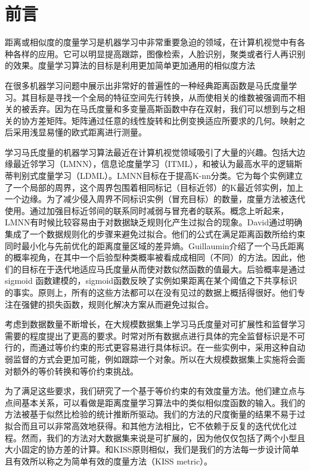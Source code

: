 \section{前言}
距离或相似度的度量学习是机器学习中非常重要急迫的领域，在计算机视觉中有各种各样的应用。它可以明显提高跟踪\cite{zheng2011person}，图像检索\cite{hoi2006learning}，人脸识别\cite{guillaumin2010multiple}，聚类\cite{ye2007adaptive}或者行人再识别\cite{dikmen2010pedestrian}的效果。度量学习算法的目标是利用更加简单更加通用的相似度方法

在很多机器学习问题中展示出非常好的普遍性的一种经典距离函数是马氏度量学习。其目标是寻找一个全局的特征空间先行转换，从而使相关的维数被强调而不相关的被丢弃。因为在马氏度量和多变量高斯函数中存在双射，我们可以想到与之相关的协方差矩阵。矩阵通过任意的线性旋转和比例变换适应所要求的几何。映射之后采用浅显易懂的欧式距离进行测量。

学习马氏度量的机器学习算法最近在计算机视觉领域吸引了大量的兴趣。包括大边缘最近邻学习（LMNN）\cite{weinberger2009distance,weinberger2008fast}，信息论度量学习（ITML）\cite{davis2007information}，和被认为最高水平的逻辑斯蒂判别式度量学习（LDML）\cite{guillaumin2009you}。LMNN\cite{weinberger2009distance,weinberger2008fast}目标在于提高K-nn分类。它为每个实例建立了一个局部的周界，这个周界包围着相同标记（目标近邻）的K最近邻实例，加上一个边缘。为了减少侵入周界不同标识实例（冒充目标）的数量，度量方法被迭代使用。通过加强目标近邻间的联系同时减弱与冒充者的联系。概念上听起来，LMNN有时候比较容易由于对数据缺乏规则化产生过拟合的现象。David\cite{davis2007information}通过明确集成了一个数据规则化的步骤来避免过拟合。他们的公式在满足距离函数所给约束同时最小化与先前优化的距离度量区域的差异熵。Guillaumin\cite{guillaumin2009you}介绍了一个马氏距离的概率视角，在其中一个后验型种类概率被看成成相同（不同）的方法。因此，他们的目标在于迭代地适应马氏度量从而使对数似然函数的值最大。后验概率是通过sigmoid 函数建模的，sigmoid函数反映了实例如果距离在某个阈值之下共享标识的事实。原则上，所有的这些方法都可以在没有见过的数据上概括得很好。他们专注在强健的损失函数，规则化解决方案从而避免过拟合。

考虑到数据数量不断增长，在大规模数据集上学习马氏度量对可扩展性和监督学习需要的程度提出了更高的要求。时常对所有数据点进行具体的完全监督标识是不可行的，而通过等价约束的形式更容易进行具体标识。在一些实例中，采用这种自动弱监督的方式会更加可能，例如跟踪一个对象。所以在大规模数据集上实施将会面对额外的等价转换和等价约束挑战。

为了满足这些要求，我们研究了一个基于等价约束的有效度量方法。他们建立点与点间基本关系，可以看做是距离度量学习算法中的类似相似度函数的输入。我们的方法被基于似然比检验的统计推断所驱动。我们的方法的尺度衡量的结果不易于过拟合而且可以非常高效地获得。和其他方法相比，它不依赖于反复的迭代优化过程。然而，我们的方法对大数据集来说是可扩展的，因为他仅仅包括了两个小型且大小固定的协方差的计算。和KISS原则相似，我们是我们的方法每一步设计简单且有效所以称之为简单有效的度量方法（KISS metric）。


